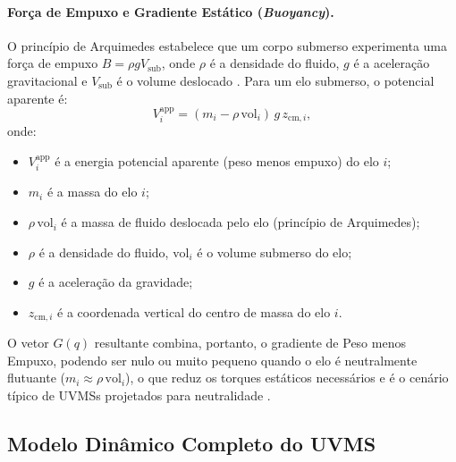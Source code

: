 \paragraph{Força de Empuxo e Gradiente Estático (\textit{Buoyancy}).}
O princípio de Arquimedes estabelece que um corpo submerso experimenta uma força de empuxo $B = \rho g V_{\text{sub}}$, onde $\rho$ é a densidade do fluido, $g$ é a aceleração gravitacional e $V_{\text{sub}}$ é o volume deslocado \cite{newman1977marine}. Para um elo submerso, o potencial aparente é:
\begin{equation}
    V_i^{\text{app}} = (m_i - \rho\,\text{vol}_i)\,g\,z_{\text{cm},i},
    \label{eq:buoyancy_potential}
\end{equation}
onde:
\begin{itemize}
    \item $V_i^{\text{app}}$ é a energia potencial aparente (peso menos empuxo) do elo $i$;
    \item $m_i$ é a massa do elo $i$;
    \item $\rho\,\text{vol}_i$ é a massa de fluido deslocada pelo elo (princípio de Arquimedes);
    \item $\rho$ é a densidade do fluido, $\text{vol}_i$ é o volume submerso do elo;
    \item $g$ é a aceleração da gravidade;
    \item $z_{\text{cm},i}$ é a coordenada vertical do centro de massa do elo $i$.
\end{itemize} O vetor $G(q)$ resultante combina, portanto, o gradiente de Peso menos Empuxo, podendo ser nulo ou muito pequeno quando o elo é neutralmente flutuante ($m_i \approx \rho\,\text{vol}_i$), o que reduz os torques estáticos necessários e é o cenário típico de UVMSs projetados para neutralidade \cite{fossen2011handbook, antonelli2014modelling}.

\subsection{Modelo Dinâmico Completo do UVMS}

